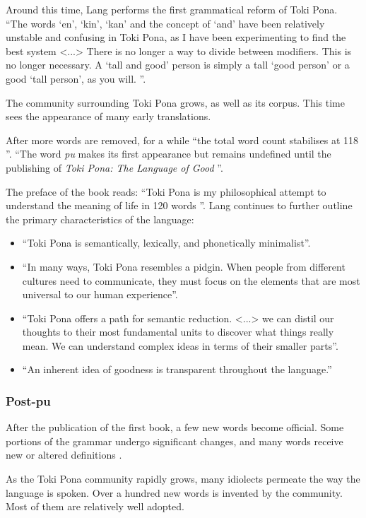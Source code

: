 \documentclass[14pt, a4paper]{extreport}
\begin{document}
Around this time, Lang performs the first grammatical reform of Toki Pona. ``The words `en', `kin', `kan' and the concept of `and' have been relatively unstable and confusing in Toki Pona, as I have been experimenting to find the best system <...> There is no longer a way to divide between modifiers. This is no longer necessary. A `tall and good' person is simply a tall `good person' or a good `tall person', as you will. \parencite{enkinkan}''.

The community surrounding Toki Pona grows, as well as its corpus. This time sees the appearance of many early translations.

After more words are removed, for a while ``the total word count stabilises at 118 \parencite{evo}''.  ``The word \textit{pu} makes its first appearance but remains undefined until the publishing of \textit{Toki Pona: The Language of Good} \parencite{evo}''.

The preface of the book reads: ``Toki Pona is my philosophical attempt to understand the meaning of life in 120 words \parencite{pu}''. Lang continues to further outline the primary characteristics of the language:

\begin{itemize}
  \item ``Toki Pona is semantically, lexically, and phonetically minimalist''.
  \item ``In many ways, Toki Pona resembles a pidgin. When people from different cultures need to communicate, they must focus on the elements that are most universal to our human experience''.
  \item ``Toki Pona offers a path for semantic reduction. <...> we can distil our thoughts to their most fundamental units to discover what things really mean. We can understand complex ideas in terms of their smaller parts''.
  \item ``An inherent idea of goodness is transparent throughout the language.''
\end{itemize}
      \subsubsection{Post-pu}
After the publication of the first book, a few new words become official. Some portions of the grammar undergo significant changes, and many words receive new or altered definitions \parencite{evo}.

As the Toki Pona community rapidly grows, many idiolects permeate the way the language is spoken. Over a hundred new words is invented by the community. Most of them are relatively well adopted.
\end{document}
